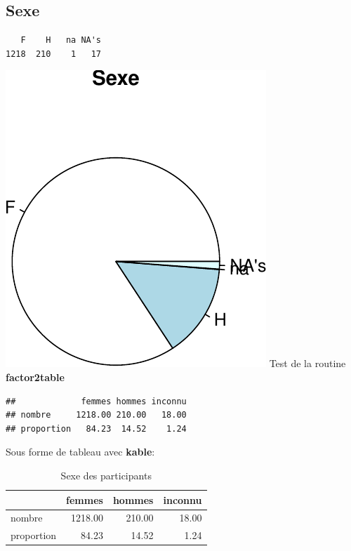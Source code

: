 \documentclass[]{article}
\newenvironment{Shaded}{\begin{snugshade}}{\end{snugshade}}
\newcommand{\KeywordTok}[1]{\textcolor[rgb]{0.13,0.29,0.53}{\textbf{{#1}}}}
\newcommand{\DataTypeTok}[1]{\textcolor[rgb]{0.13,0.29,0.53}{{#1}}}
\newcommand{\DecValTok}[1]{\textcolor[rgb]{0.00,0.00,0.81}{{#1}}}
\newcommand{\StringTok}[1]{\textcolor[rgb]{0.31,0.60,0.02}{{#1}}}
\newcommand{\NormalTok}[1]{{#1}}
\begin{document}
\subsection{Sexe}\label{sexe}

\begin{verbatim}
   F    H   na NA's 
1218  210    1   17 
\end{verbatim}

\includegraphics{qs_etudiants_files/figure-latex/sexe-1.pdf} Test de la
routine \textbf{factor2table}

\begin{Shaded}
\end{Shaded}

\begin{verbatim}
##             femmes hommes inconnu
## nombre     1218.00 210.00   18.00
## proportion   84.23  14.52    1.24
\end{verbatim}

Sous forme de tableau avec \textbf{kable}:

\begin{table}

\caption{Sexe des participants}
\begin{tabular}{l|r|r|r}
\hline
  & femmes & hommes & inconnu\\
\hline
nombre & 1218.00 & 210.00 & 18.00\\
\hline
proportion & 84.23 & 14.52 & 1.24\\
\hline
\end{tabular}
\end{table}
\end{document}
